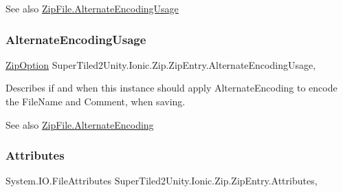 \begin{DoxySeeAlso}{See also}
\mbox{\hyperlink{class_super_tiled2_unity_1_1_ionic_1_1_zip_1_1_zip_file_abfa9e860cc57465297df205d1d48a616}{Zip\+File.\+Alternate\+Encoding\+Usage}}


\end{DoxySeeAlso}
\mbox{\label{class_super_tiled2_unity_1_1_ionic_1_1_zip_1_1_zip_entry_a972512ebe8d25c895ad0d67e75e24bfb}} 
\subsubsection{\texorpdfstring{Alternate\+Encoding\+Usage}{AlternateEncodingUsage}}
{\footnotesize\ttfamily \mbox{\hyperlink{namespace_super_tiled2_unity_1_1_ionic_1_1_zip_a25d431031427c142eba970006eee630c}{Zip\+Option}} Super\+Tiled2\+Unity.\+Ionic.\+Zip.\+Zip\+Entry.\+Alternate\+Encoding\+Usage\hspace{0.3cm}{\ttfamily [get]}, {\ttfamily [set]}}



Describes if and when this instance should apply Alternate\+Encoding to encode the File\+Name and Comment, when saving. 

\begin{DoxySeeAlso}{See also}
\mbox{\hyperlink{class_super_tiled2_unity_1_1_ionic_1_1_zip_1_1_zip_file_a5fbf6af29062f76b6ce06c6197ff6c8b}{Zip\+File.\+Alternate\+Encoding}}


\end{DoxySeeAlso}
\mbox{\label{class_super_tiled2_unity_1_1_ionic_1_1_zip_1_1_zip_entry_a65bea4a1790f224d1be99cd8d51be425}} 
\subsubsection{\texorpdfstring{Attributes}{Attributes}}
{\footnotesize\ttfamily System.\+I\+O.\+File\+Attributes Super\+Tiled2\+Unity.\+Ionic.\+Zip.\+Zip\+Entry.\+Attributes\hspace{0.3cm}{\ttfamily [get]}, {\ttfamily [set]}}




